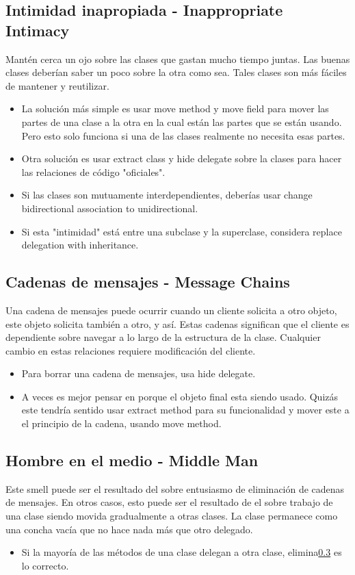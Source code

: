 \documentclass[11pt,a4paper,oneside]{book}
\begin{document}
\subsection{Intimidad inapropiada - Inappropriate Intimacy}
\label{inappropriateintimacy}
Mantén cerca un ojo sobre las clases que gastan mucho tiempo juntas. Las buenas clases deberían saber un poco sobre la otra como sea. Tales clases son más fáciles de mantener y reutilizar.
\newline
\begin{itemize}
    \item La solución más simple es usar move method y move field para mover las partes de una clase a la otra en la cual están las partes que se están usando. Pero esto solo funciona si una de las clases realmente no necesita esas partes.
    \item Otra solución es usar extract class y hide delegate sobre la clases para hacer las relaciones de código "oficiales".
    \item Si las clases son mutuamente interdependientes, deberías usar change bidirectional association to unidirectional.
    \item Si esta "intimidad" está entre una subclase y la superclase, considera replace delegation with inheritance.
\end{itemize}
    
\subsection{Cadenas de mensajes - Message Chains}
\label{messagechains}
Una cadena de mensajes puede ocurrir cuando un cliente solicita a otro objeto, este objeto solicita también a otro, y así. Estas cadenas significan que el cliente es dependiente sobre navegar a lo largo de la estructura de la clase. Cualquier cambio en estas relaciones requiere modificación del cliente.
\newline
\begin{itemize}
    \item Para borrar una cadena de mensajes, usa hide delegate.
    \item A veces es mejor pensar en porque el objeto final esta siendo usado. Quizás este tendría sentido usar extract method para su funcionalidad y mover este a el principio de la cadena, usando move method.
\end{itemize}
    
\subsection{Hombre en el medio - Middle Man}
\label{middleman}
Este smell puede ser el resultado del sobre entusiasmo de eliminación de cadenas de mensajes.
\newline
En otros casos, esto puede ser el resultado de el sobre trabajo de una clase siendo movida gradualmente a otras clases. La clase permanece como una concha vacía que no hace nada más que otro delegado.
\begin{itemize}
    \item Si la mayoría de las métodos de una clase delegan a otra clase, elimina\ref{middleman} es lo correcto.
\end{itemize}
\end{document}
